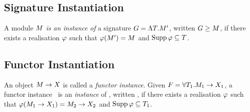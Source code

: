 
\subsection{Signature Instantiation}
A module $\M$ {\sl is an instance of} a signature
$\G=\sig{\T}{\M'}$,
written $\siginstantiates{\G}{\M}$, if there exists a realisation
$\tyrea$
such that $\tyrea(\M')=\M$ and $\Supp\tyrea\subseteq\T$.


\subsection{Functor Instantiation}
An object $\funinst{\M}{\XM}$ is called a {\sl functor instance}.
Given $\F=\longfun[1]$,
a functor instance \
 is an {\sl instance} of
\F,
written ,
if there exists a realisation $\tyrea$
such that
$\tyrea(\funinst{\M_1}{\XM_1})=  \funinst{\M_2}{\XM_2}$ and
$\Supp\tyrea\subseteq\T_1$.


